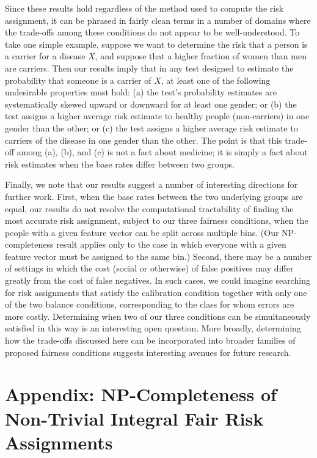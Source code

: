 \documentclass[11pt]{article}
\begin{document}
Since these results hold regardless of the
method used to compute the risk assignment, it can be phrased in fairly
clean terms in a number of domains where the trade-offs among these
conditions do not appear to be well-understood.
To take one simple example, suppose we want to determine the risk that
a person is a carrier for a disease $X$, and suppose that a higher fraction
of women than men are carriers.
Then our results imply that
in any test designed to estimate the probability that someone is a 
carrier of $X$, at least one of the following undesirable properties must hold:
(a) the test's probability estimates are systematically skewed upward or
downward for at least one gender;
or (b) the test assigns a higher average risk estimate to healthy people 
(non-carriers) in one gender than the other; 
or (c) the test assigns a higher average risk estimate to carriers of
the disease in one gender than the other.
The point is that this trade-off among (a), (b), and (c) is not a fact
about medicine; it is simply a fact about risk estimates when the 
base rates differ between two groups.

Finally, we note that our results suggest a number of interesting directions
for further work.  First, when the base rates between the two underlying
groups are equal, our results do not resolve the computational tractability
of finding the most accurate risk assignment, subject to our three
fairness conditions, when the people with a given feature vector 
can be split across multiple bins.  (Our NP-completeness result applies
only to the case in which everyone with a given feature vector
must be assigned to the same bin.)  Second, there may be a number of
settings in which the cost (social or otherwise) of false positives
may differ greatly from the cost of false negatives.
In such cases, we could imagine searching for risk assignments 
that satisfy the calibration condition together with only one
of the two balance conditions, corresponding to the class for whom
errors are more costly.  Determining when two of our three 
conditions can be simultaneously satisfied in this way
is an interesting open question.
More broadly, determining how the trade-offs discussed here can be
incorporated into broader families of proposed fairness conditions
suggests interesting avenues for future research.





\section*{Appendix: NP-Completeness of Non-Trivial Integral Fair Risk Assignments}
\end{document}
